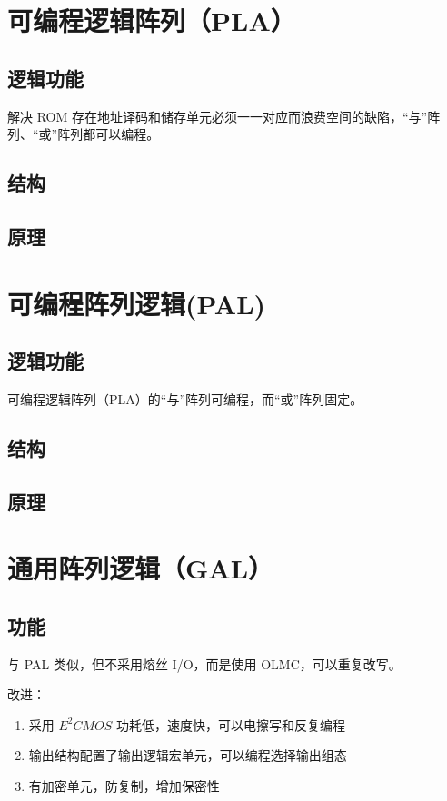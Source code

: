 \newpage
\section{可编程逻辑阵列（PLA）}

\subsection{逻辑功能}

解决 ROM 存在地址译码和储存单元必须一一对应而浪费空间的缺陷，“与”阵列、“或”阵列都可以编程。

\subsection{结构}

\subsection{原理}


\newpage
\section{可编程阵列逻辑(PAL)}

\subsection{逻辑功能}

可编程逻辑阵列（PLA）的“与”阵列可编程，而“或”阵列固定。

\subsection{结构}

\subsection{原理}


\newpage
\section{通用阵列逻辑（GAL）}

\subsection{功能}

与 PAL 类似，但不采用熔丝 I/O，而是使用 OLMC，可以重复改写。

改进：
\begin{enumerate}
    \item 采用 $E^2CMOS$ 功耗低，速度快，可以电擦写和反复编程
    \item 输出结构配置了输出逻辑宏单元，可以编程选择输出组态
    \item 有加密单元，防复制，增加保密性
\end{enumerate}

